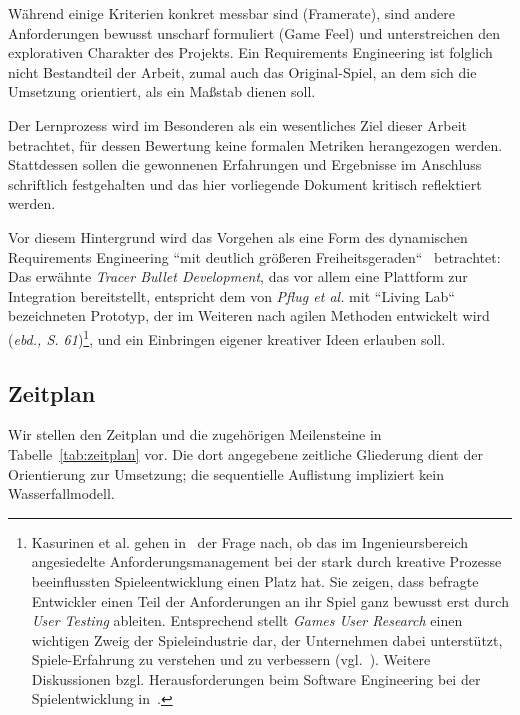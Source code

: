 Während einige Kriterien konkret messbar sind (Framerate), sind andere Anforderungen bewusst unscharf formuliert (Game Feel) und unterstreichen den explorativen Charakter des Projekts.
Ein Requirements Engineering ist folglich nicht Bestandteil der Arbeit, zumal auch das Original-Spiel, an dem sich die Umsetzung orientiert, als ein Maßstab dienen soll.\par

Der Lernprozess wird im Besonderen als ein wesentliches Ziel dieser Arbeit betrachtet, für dessen Bewertung keine formalen Metriken herangezogen werden.
Stattdessen sollen die gewonnenen Erfahrungen und Ergebnisse im Anschluss schriftlich festgehalten und das hier vorliegende Dokument kritisch reflektiert werden.\par

Vor diesem Hintergrund wird das Vorgehen als eine Form des dynamischen Requirements Engineering ``mit deutlich größeren Freiheitsgeraden``~\cite[60]{MRP21} betrachtet: Das erwähnte \textit{Tracer Bullet Development}, das vor allem eine Plattform zur Integration bereitstellt, entspricht dem von \textit{Pflug et al.} mit ``Living Lab`` bezeichneten Prototyp, der im Weiteren nach agilen Methoden entwickelt wird (\textit{ebd., S. 61})\footnote{
    Kasurinen et al. gehen in~\cite[]{KMS14} der Frage nach, ob das im Ingenieursbereich angesiedelte Anforderungsmanagement bei der stark durch kreative Prozesse beeinflussten Spieleentwicklung einen Platz hat. Sie zeigen, dass befragte Entwickler einen Teil der Anforderungen an ihr Spiel ganz bewusst erst durch \textit{User Testing} ableiten. Entsprechend stellt \textit{Games User Research} einen wichtigen Zweig der Spieleindustrie dar, der Unternehmen dabei unterstützt, Spiele-Erfahrung zu verstehen und zu verbessern (vgl.~\cite[26]{Zam18}). Weitere Diskussionen bzgl. Herausforderungen beim Software Engineering bei der Spielentwicklung in~\cite[]{KH09}.
}, und ein Einbringen eigener kreativer Ideen erlauben soll.\\

\subsection{Zeitplan}

Wir stellen den Zeitplan und die zugehörigen Meilensteine in Tabelle~\ref{tab:zeitplan} vor.
Die dort angegebene zeitliche Gliederung dient der Orientierung zur Umsetzung; die sequentielle Auflistung impliziert kein Wasserfallmodell.

